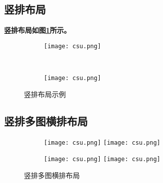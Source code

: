 \lipsum

\subsection{竖排布局}
\textbf{竖排布局如图\ref{F.csu_col}所示。}

\begin{figure}[!htb]
    \centering
    \begin{subfigure}[t]{0.15\linewidth}
        \caption{}
        \begin{minipage}[b]{1\linewidth}
        \texttt{[image: csu.png]}
        \end{minipage}
    \end{subfigure}\\
    \begin{subfigure}[t]{0.15\linewidth}
        \caption{}
        \begin{minipage}[b]{1\linewidth}
        \texttt{[image: csu.png]}
        \end{minipage}
    \end{subfigure}
    \caption{竖排布局示例}
    \label{F.csu_col}
\end{figure}

\lipsum

\subsection{竖排多图横排布局}

\begin{figure}[!htb]
    \centering
    \begin{subfigure}[t]{0.13\linewidth}
        \caption{}
        \begin{minipage}[b]{1\linewidth}
        \texttt{[image: csu.png]} \vspace{-1ex} \vfill
        \texttt{[image: csu.png]}
        \end{minipage}
    \end{subfigure}
    \begin{subfigure}[t]{0.13\linewidth}
        \caption{}
        \begin{minipage}[b]{1\linewidth}
        \texttt{[image: csu.png]} \vspace{-1ex} \vfill
        \texttt{[image: csu.png]}
        \end{minipage}
    \end{subfigure}
    \caption{竖排多图横排布局}
    \label{F.csu_col_row}
\end{figure}

